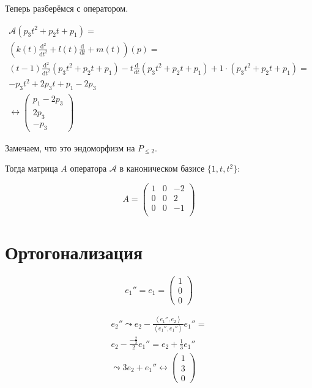 \documentclass[12pt, a4paper]{article}
\begin{document}
    Теперь разберёмся с оператором.

    \begin{multline}
        \mathcal{A} (p_3 t^2 + p_2 t + p_1) = \\
        \left(k(t) \frac{\mathrm{d}^{2}}{\mathrm{d} t^{2}}+l(t) \frac{\mathrm{d}}{\mathrm{d} t}+m(t)\right)(p) = \\
        (t - 1) \frac{\mathrm{d}^{2}}{\mathrm{d} t^{2}}(p_3 t^2 + p_2 t + p_1) - t \frac{\mathrm{d}}{\mathrm{d} t} (p_3 t^2 + p_2 t + p_1) + 1 \cdot (p_3 t^2 + p_2 t + p_1) = \\
        -p_3 t^2 + 2 p_3 t + p_1 - 2 p_3 \\ \leftrightarrow \begin{pmatrix}
           p_1 - 2 p_3 \\
           2 p_3 \\
           - p_3
        \end{pmatrix}
    \end{multline}

    Замечаем, что это эндоморфизм на $P_{\leqslant 2}$.

    Тогда матрица $A$ оператора $\mathcal{A}$ в каноническом базисе $\{1, t, t^2\}$:

    \begin{equation}
        A = \begin{pmatrix}
            1 & 0 & -2 \\
            0 & 0 & 2 \\ 
            0 & 0 &  -1 \\
        \end{pmatrix}
    \end{equation}

    \section{Ортогонализация}

    \begin{equation}
        e_1'' = e_1 = \begin{pmatrix}
            1 \\ 0 \\0
        \end{pmatrix}
    \end{equation}

    \begin{multline}
        e_2'' \leadsto e_2 - \frac{\left\langle e_1'', e_2 \right\rangle}
        {\left\langle e_1'', e_1'' \right\rangle} e_1''=  \\
        e_2 - \frac{-\frac 23}{2} e_1'' = e_2 + \frac 13 e_1'' \\
        \leadsto 3 e_2 + e_1'' \leftrightarrow \begin{pmatrix}
            1 \\ 3 \\ 0
        \end{pmatrix}
    \end{multline}
    
\end{document}
